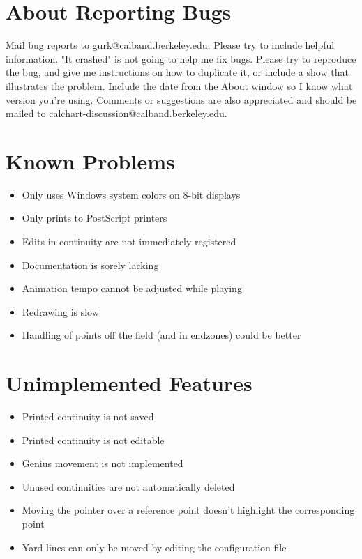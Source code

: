 \section{About Reporting Bugs}\label{reportingbugs}

Mail bug reports to gurk@calband.berkeley.edu.  Please try to include
helpful information.  "It crashed" is not going to help me fix bugs.
Please try to reproduce the bug, and give me instructions on how to
duplicate it, or include a show that illustrates the problem.  Include
the date from the About window so I know what version you're using.  Comments
or suggestions are also appreciated and should be mailed to
calchart-discussion@calband.berkeley.edu.

\section{Known Problems}\label{problems}

\begin{itemize}\itemsep=0pt
\item Only uses Windows system colors on 8-bit displays
\item Only prints to PostScript printers
\item Edits in continuity are not immediately registered
\item Documentation is sorely lacking
\item Animation tempo cannot be adjusted while playing
\item Redrawing is slow
\item Handling of points off the field (and in endzones) could be better
\end{itemize}

\section{Unimplemented Features}\label{notdone}

\begin{itemize}\itemsep=0pt
\item Printed continuity is not saved
\item Printed continuity is not editable
\item Genius movement is not implemented
\item Unused continuities are not automatically deleted
\item Moving the pointer over a reference point doesn't highlight the
corresponding point
\item Yard lines can only be moved by editing the configuration file
\end{itemize}
